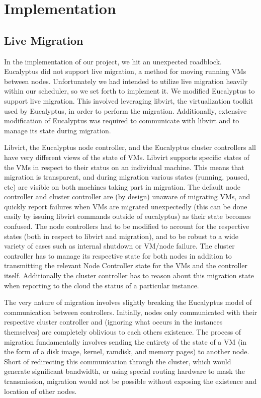 \section{Implementation}

\subsection{Live Migration}


In the implementation of our project, we hit an unexpected roadblock.  Eucalyptus did not support live migration, a method for moving running VMs between nodes.  Unfortunately we had intended to utilize live migration heavily within our scheduler, so we set forth to implement it.  We modified Eucalyptus to support live migration.  This involved leveraging libvirt, the virtualization toolkit used by Eucalyptus, in order to perform the migration.  Additionally, extensive modification of Eucalyptus was required to communicate with libvirt and to manage its state during migration.  

Libvirt, the Eucalyptus node controller, and the Eucalyptus cluster controllers all have very different views of the state of VMs.  Libvirt supports specific states of the VMs in respect to their status on an individual machine. This means that migration is transparent, and during migration various states (running, paused, etc) are visible on both machines taking part in migration.  The default node controller and cluster controller are (by design) unaware of migrating VMs, and quickly report failures when VMs are migrated unexpectedly (this can be done easily by issuing libvirt commands outside of eucalyptus) as their state becomes confused.  The node controllers had to be modified to account for the respective states (both in respect to libvirt and migration), and to be robust to a wide variety of cases such as internal shutdown or VM/node failure.  The cluster controller has to manage its respective state for both nodes in addition to transmitting the relevant Node Controller state for the VMs and the controller itself.  Additionally the cluster controller has to reason about this migration state when reporting to the cloud the status of a particular instance.

The very nature of migration involves slightly breaking the Eucalyptus model of communication between controllers.  Initially, nodes only communicated with their respective cluster controller and (ignoring what occurs in the instances themselves) are completely oblivious to each others existence.  The process of migration fundamentally involves sending the entirety of the state of a VM (in the form of a disk image, kernel, ramdisk, and memory pages) to another node.  Short of redirecting this communication through the cluster, which would generate significant bandwidth, or using special routing hardware to mask the transmission, migration would not be possible without exposing the existence and location of other nodes.  

